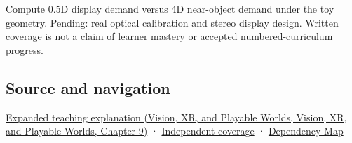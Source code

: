 Compute 0.5D display demand versus 4D near-object demand under the toy geometry. Pending: real optical calibration and stereo display design. Written coverage is not a claim of learner mastery or accepted numbered-curriculum progress.

\subsection{Source and navigation}\label{appendix-f90cee1be7a4-source-and-navigation}

\href{../07-Vision-XR-and-Playable-Worlds/main.pdf\#nameddest=04-visual-computing-ii-ch042-focus-and-stereo-can-disagree-even-when-the-images-are-sharp}{Expanded teaching explanation (Vision, XR, and Playable Worlds, Vision, XR, and Playable Worlds, Chapter 9)} · \hyperref[appendix-fd090d982a15-xr01---independent-seeing-and-representation-source]{Independent coverage} · \hyperref[appendix-4ad47bdd269a]{Dependency Map}
